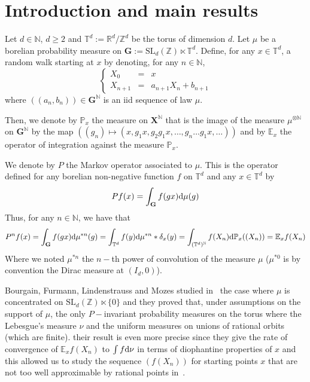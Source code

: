 \documentclass[11pt]{amsart}
\theoremstyle{definition}
\theoremstyle{remark}
\numberwithin{equation}{section}
\begin{document}
\maketitle

\tableofcontents

\section{Introduction and main results}

Let $d\in {\mathbb N}$, $d\geqslant 2$ and ${\mathbb T}^d:= {\mathbb R}^d/{\mathbb Z}^d$ be the torus of dimension $d$. Let $\mu$ be a borelian probability measure on ${\mathbf G}:=\mathrm{SL}_d({\mathbb Z}) \ltimes {\mathbb T}^d$. Define, for any $x\in {\mathbb T}^d$, a random walk starting at $x$ by denoting, for any $n\in {\mathbb N}$,
\[
\left\{\begin{array}{rcl}
X_0 &=&x\\
X_{n+1} &=& a_{n+1} X_n + b_{n+1}
\end{array}\right.
\]
where $((a_n,b_n))\in {\mathbf G}^{\mathbb N}$ is an iid sequence of law $\mu$.

Then, we denote by ${\mathbb P}_x$ the measure on ${\mathbf X}^{\mathbb N}$ that is the image of the measure $\mu^{\otimes {\mathbb N}}$ on ${\mathbf G}^{\mathbb N}$ by the map $\left((g_n) \mapsto (x,g_1 x, g_2 g_1 x, \dots , g_n \dots g_1 x, \dots)\right)$ and by ${\mathbb E}_x$ the operator of integration against the measure ${\mathbb P}_x$.

We denote by $P$ the Markov operator associated to  $\mu$. This is the operator defined for any borelian non-negative function $f$ on ${\mathbb T}^d$ and any $x\in {\mathbb T}^d$ by
\[
Pf(x) = \int_{\mathbf G} f(gx){{\rm d}}\mu(g)
\]
Thus, for any $n\in {\mathbb N}$, we have that
\[
P^n f(x) = \int_{\mathbf G} f(gx) {{\rm d}}\mu^{\ast n}(g) = \int_{{\mathbb T}^d} f(y) {{\rm d}}\mu^{\ast n} \ast \delta_x(y) = \int_{({\mathbb T}^d)^{\mathbb N}} f(X_n) {{\rm d}}{\mathbb P}_x((X_n)) = {\mathbb E}_x f(X_n)
\]
Where we noted $\mu^{\ast n}$ the $n-$th power of convolution of the measure $\mu$ ($\mu^{\ast 0}$ is by convention the Dirac measure at $(I_d,0)$).

\bigskip
Bourgain, Furmann, Lindenstrauss and Mozes studied in~\cite{BFLM11} the case where $\mu$ is concentrated on $\mathrm{SL}_d({\mathbb Z}) \ltimes \{0\}$ and they proved that, under assumptions on the support of $\mu$, the only $P-$invariant probability measures on the torus where the Lebesgue's measure $\nu$ and the uniform measures on unions of rational orbits (which are finite). their result is even more precise since they give the rate of convergence of ${\mathbb E}_x f(X_n)$ to $\int f{{\rm d}}\nu$ in terms of diophantine properties of $x$ and this allowed us to study the sequence $(f(X_n))$ for starting points $x$ that are not too well approximable by rational points in~\cite{Boytore}.
\end{document}
